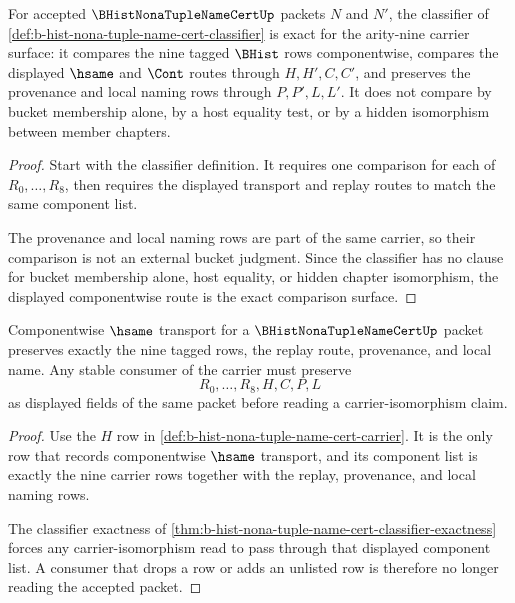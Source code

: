 \begin{theorem}
\label{thm:b-hist-nona-tuple-name-cert-classifier-exactness}
For accepted $\BHistNonaTupleNameCertUp$ packets $N$ and $N'$, the classifier of \autoref{def:b-hist-nona-tuple-name-cert-classifier} is exact for the arity-nine carrier surface: it compares the nine tagged $\BHist$ rows componentwise, compares the displayed $\hsame$ and $\Cont$ routes through $H,H',C,C'$, and preserves the provenance and local naming rows through $P,P',L,L'$. It does not compare by bucket membership alone, by a host equality test, or by a hidden isomorphism between member chapters.
\end{theorem}
\begin{proof}
Start with the classifier definition. It requires one comparison for each of $R_0,\ldots,R_8$, then requires the displayed transport and replay routes to match the same component list.

The provenance and local naming rows are part of the same carrier, so their comparison is not an external bucket judgment. Since the classifier has no clause for bucket membership alone, host equality, or hidden chapter isomorphism, the displayed componentwise route is the exact comparison surface.
\end{proof}

\begin{theorem}
\label{thm:b-hist-nona-tuple-name-cert-componentwise-stability}
Componentwise $\hsame$ transport for a $\BHistNonaTupleNameCertUp$ packet preserves exactly the nine tagged rows, the replay route, provenance, and local name. Any stable consumer of the carrier must preserve
$$
R_0,\ldots,R_8,H,C,P,L
$$
as displayed fields of the same packet before reading a carrier-isomorphism claim.
\end{theorem}
\begin{proof}
Use the $H$ row in \autoref{def:b-hist-nona-tuple-name-cert-carrier}. It is the only row that records componentwise $\hsame$ transport, and its component list is exactly the nine carrier rows together with the replay, provenance, and local naming rows.

The classifier exactness of \autoref{thm:b-hist-nona-tuple-name-cert-classifier-exactness} forces any carrier-isomorphism read to pass through that displayed component list. A consumer that drops a row or adds an unlisted row is therefore no longer reading the accepted packet.
\end{proof}

